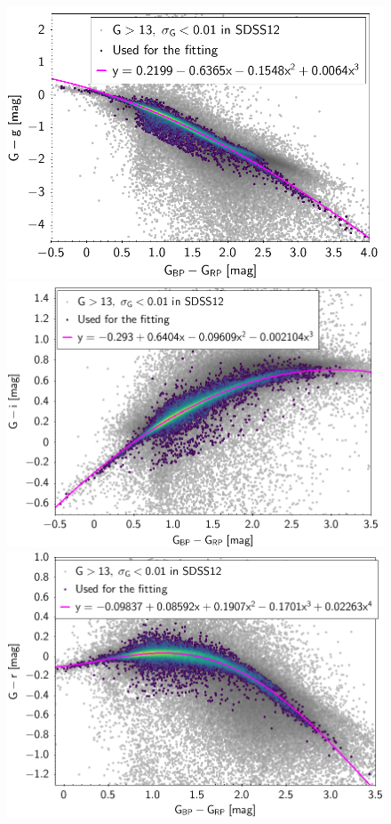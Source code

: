 
\begin{figure}[!ht]
	\centering
	\includegraphics[scale=0.18]{Muestra/Secciones/Figures/Gaia-SDSS-Transform-g.png}
	\includegraphics[scale=0.18]{Muestra/Secciones/Figures/Gaia-SDSS-Transform-i.png}
	\includegraphics[scale=0.18]{Muestra/Secciones/Figures/Gaia-SDSS-Transform-r.png}


\end{figure}
